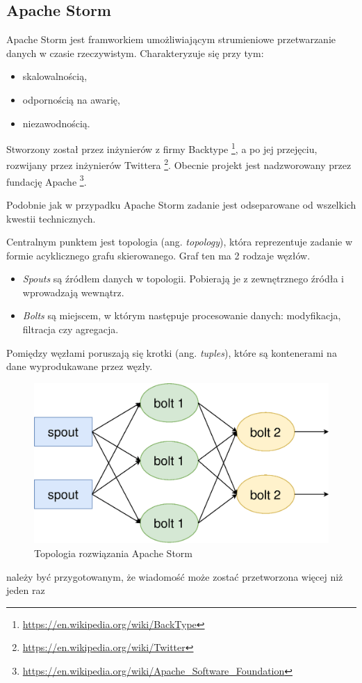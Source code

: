 \subsection{Apache Storm}
Apache Storm jest framworkiem umożliwiającym strumieniowe przetwarzanie danych w czasie rzeczywistym.
Charakteryzuje się przy tym:
\begin{itemize}
  \item skalowalnością,
  \item odpornością na awarię,
  \item niezawodnością.
\end{itemize}
Stworzony został przez inżynierów z firmy
Backtype \footnote{\url{https://en.wikipedia.org/wiki/BackType}},
a po jej przejęciu, rozwijany przez inżynierów Twittera \footnote{\url{https://en.wikipedia.org/wiki/Twitter}}.
Obecnie projekt jest nadzworowany przez fundację Apache \footnote{\url{https://en.wikipedia.org/wiki/Apache_Software_Foundation}}.

Podobnie jak w przypadku Apache Storm zadanie jest odseparowane od wszelkich kwestii technicznych.

Centralnym punktem jest topologia (ang. \textit{topology}),
która reprezentuje zadanie w formie acyklicznego grafu skierowanego.
Graf ten ma 2 rodzaje węzłów.
\begin{itemize}
  \item \textit{Spouts} są źródłem danych w topologii.
  Pobierają je z zewnętrznego źródła i wprowadzają wewnątrz.
  \item \textit{Bolts} są miejscem,
  w którym następuje procesowanie danych: modyfikacja, filtracja czy agregacja.
\end{itemize}
Pomiędzy węzłami poruszają się krotki (ang. \textit{tuples}),
które są kontenerami na dane wyprodukawane przez węzły.
\begin{figure}[htbp]
\centering
	\includegraphics[width=1\textwidth]{img/storm}
	\caption{Topologia rozwiązania Apache Storm}
  \label{fig:StormTopology}
\end{figure}
należy być przygotowanym,
że wiadomość może zostać przetworzona więcej niż jeden raz
